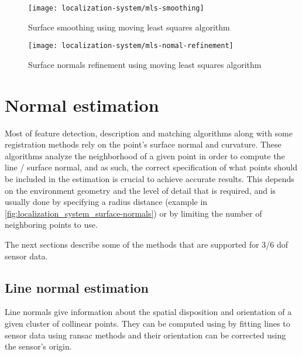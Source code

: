 \begin{figure}[H]
	\centering
	\texttt{[image: localization-system/mls-smoothing]}
	\caption[Surface smoothing using moving least squares algorithm]{Surface smoothing using moving least squares algorithm\protect\footnotemark}
	\label{fig:localization_system_mls-smoothing}
\end{figure}

\begin{figure}[H]
	\centering
	\texttt{[image: localization-system/mls-nomal-refinement]}
	\caption[Surface normals refinement using moving least squares algorithm]{Surface normals refinement using moving least squares algorithm \cite{Rusu2010a}}
	\label{fig:localization_system_mls-nomal-refinement}
\end{figure}



\section{Normal estimation}

Most of feature detection, description and matching algorithms along with some registration methods rely on the point's surface normal and curvature. These algorithms analyze the neighborhood of a given point in order to compute the line / surface normal, and as such, the correct specification of what points should be included in the estimation is crucial to achieve accurate results. This depends on the environment geometry and the level of detail that is required, and is usually done by specifying a radius distance (example in \cref{fig:localization_system_surface-normals}) or by limiting the number of neighboring points to use.

The next sections describe some of the methods that are supported for 3/6 \gls{dof} sensor data.


\subsection{Line normal estimation}

Line normals give information about the spatial disposition and orientation of a given cluster of collinear points. They can be computed using by fitting lines to sensor data using \gls{ransac} methods \cite{Fischler1981} and their orientation can be corrected using the sensor's origin.



